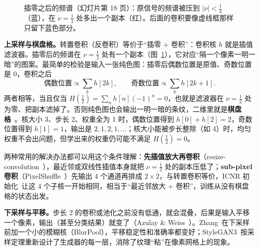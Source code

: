 \begin{figure}[htbp]
\centering
{}
\caption{插零之后的频谱（幻灯片第 18 页）：原信号的频谱被压到 $|\nu|<\tfrac14$（蓝），在 $\nu=\tfrac12$ 处多出一个副本（红）。后面的卷积要像虚线框那样只留下蓝色部分。}\label{fig:zeros}
\end{figure}

\textbf{上采样与棋盘格。}转置卷积（反卷积）等价于“插零 + 卷积”：卷积核 $h$ 就是插值滤波器。插零后的频谱在 $\nu=\tfrac12$ 处有一个副本（图~\ref{fig:zeros}），它对应“隔一个像素一明一暗”的图案。最简单的检验是输入一张纯色图：插零后偶数位置是原值、奇数位置是 0，卷积之后
\[
\text{偶数位置}\propto\sum_k h[2k],\qquad\text{奇数位置}\propto\sum_k h[2k+1].
\]
两者相等，当且仅当 $H(\tfrac12)=\sum_n h[n](-1)^n=0$，也就是滤波器在 $\nu=\tfrac12$ 处为零、把副本滤掉了。否则纯色图也会输出一明一暗的条纹，二维里就是\textbf{棋盘格}~\cite{odena2016}。核大小 3、步长 2、权重全为 1 时，偶数位置得到 $h[0]+h[2]=2$，奇数位置得到 $h[1]=1$，输出是 $2,1,2,1,\dots$；核大小能被步长整除（如 4）时，均匀权重不会出问题，但学出来的权重仍可能不满足 $H(\tfrac12)=0$。

两种常用的解决办法都可以用这个条件理解：\textbf{先插值放大再卷积}（resize-convolution~\cite{odena2016}），最近邻或双线性插值本身就把 $\nu=\tfrac12$ 处的副本压低了；\textbf{sub-pixel 卷积}（PixelShuffle~\cite{shi2016}）先输出 4 个通道再排成 $2\times2$，与转置卷积等价，ICNR 初始化~\cite{aitken2017}让这 4 个子核一开始相同，相当于“最近邻放大 + 卷积”，训练从没有棋盘格的状态出发。

\textbf{下采样与平移。}步长 2 的卷积或池化之前没有低通，就会混叠，后果是输入平移一个像素，输出（甚至分类结果）就变了（Azulay \& Weiss~\cite{azulay2019}）。Zhang~\cite{zhang2019}在下采样前加一个小的模糊核（BlurPool），平移稳定性和准确率都变好；StyleGAN3~\cite{karras2021}按采样定理重新设计了生成器的每一层，消除了纹理“粘”在像素网格上的现象。

